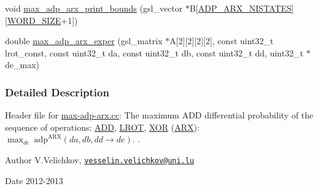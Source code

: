 \begin{DoxyCompactItemize}
\item 
void \hyperlink{max-adp-arx_8hh_ae6cb4039d510247582c4e275a7efc3d1}{max\-\_\-adp\-\_\-arx\-\_\-print\-\_\-bounds} (gsl\-\_\-vector $\ast$\-B\mbox{[}\hyperlink{adp-arx_8hh_af9236f8d08a54b97ed2199271de979f6}{\-A\-D\-P\-\_\-\-A\-R\-X\-\_\-\-N\-I\-S\-T\-A\-T\-E\-S}\mbox{]}\mbox{[}\hyperlink{common_8hh_a92ed8507d1cd2331ad09275c5c4c1c89}{\-W\-O\-R\-D\-\_\-\-S\-I\-Z\-E}+1\mbox{]})
\item 
double \hyperlink{max-adp-arx_8hh_abfb1c22b9460ed0c2bb71497e214f75c}{max\-\_\-adp\-\_\-arx\-\_\-exper} (gsl\-\_\-matrix $\ast$\-A\mbox{[}2\mbox{]}\mbox{[}2\mbox{]}\mbox{[}2\mbox{]}\mbox{[}2\mbox{]}, const uint32\-\_\-t lrot\-\_\-const, const uint32\-\_\-t da, const uint32\-\_\-t db, const uint32\-\_\-t dd, uint32\-\_\-t $\ast$de\-\_\-max)
\end{DoxyCompactItemize}


\subsubsection{\-Detailed \-Description}
\-Header file for \hyperlink{max-adp-arx_8cc}{max-\/adp-\/arx.\-cc}\-: \-The maximum \-A\-D\-D differential probability of the sequence of operations\-: \hyperlink{common_8hh_af3b709fb668cf93ca09e2a46a2a031a8}{\-A\-D\-D}, \hyperlink{common_8hh_abe2030c44a97657e1b1dbe9b0e093a7b}{\-L\-R\-O\-T}, \hyperlink{common_8hh_a6de9ec3b3b57377b69a82239ea52ec6e}{\-X\-O\-R} (\hyperlink{common_8hh_a7d3da57c58af293c7c57e4f1b551849d}{\-A\-R\-X})\-: $\max_{de}~\mathrm{adp}^{\mathrm{ARX}}(da,db,dd \rightarrow de)$. . \begin{DoxyAuthor}{\-Author}
\-V.\-Velichkov, \href{mailto:vesselin.velichkov@uni.lu}{\tt vesselin.\-velichkov@uni.\-lu} 
\end{DoxyAuthor}
\begin{DoxyDate}{\-Date}
2012-\/2013 
\end{DoxyDate}


